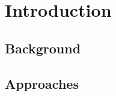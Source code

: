 

\chapter{Introduction}
\label{chapterIntroduction}
\ifpdf
    \graphicspath{{Intro/fig/}}
\else
    \graphicspath{{Intro/fig/}}
\fi


\section{Background} 

\section{Approaches} 


